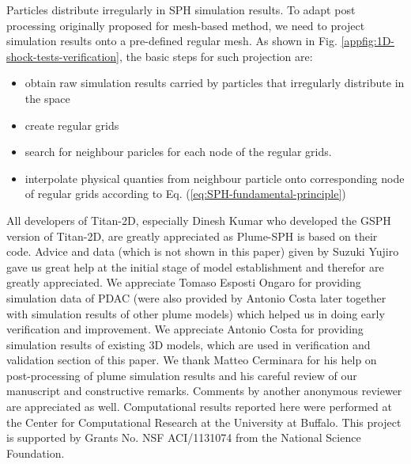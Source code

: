 \documentclass[gmd, manuscript]{copernicus}
\begin{document}
Particles distribute irregularly in SPH simulation results. To adapt post processing originally proposed for mesh-based method, we need to project simulation results onto a pre-defined regular mesh. As shown in Fig. \ref{appfig:1D-shock-tests-verification}, the basic steps for such projection are:
\begin{itemize}
\item obtain raw simulation results carried by particles that irregularly distribute in the space
\item create regular grids
\item search for neighbour paricles for each node of the regular grids.
\item interpolate physical quanties from neighbour particle onto corresponding node of regular grids according to Eq. (\ref{eq:SPH-fundamental-principle})
\end{itemize}


\begin{acknowledgements}
All developers of Titan-2D, especially Dinesh Kumar who developed the GSPH version of Titan-2D, are greatly appreciated as Plume-SPH is based on their code. Advice and data (which is not shown in this paper) given by Suzuki Yujiro gave us great help at the initial stage of model establishment and therefor are greatly appreciated. We appreciate Tomaso Esposti Ongaro for providing simulation data of PDAC (were also provided by Antonio Costa later together with simulation results of other plume models) which helped us in doing early verification and improvement. We appreciate Antonio Costa for providing simulation results of existing 3D models, which are used in verification and validation section of this paper. We thank Matteo Cerminara for his help on post-processing of plume simulation results and his careful review of our manuscript and constructive remarks. Comments by another anonymous reviewer are appreciated as well. Computational results reported here were performed at the Center for Computational Research at the University at Buffalo. This project is supported by Grants No. NSF ACI/1131074 from the National Science Foundation.
\end{acknowledgements}

\clearpage


%

\end{document}
